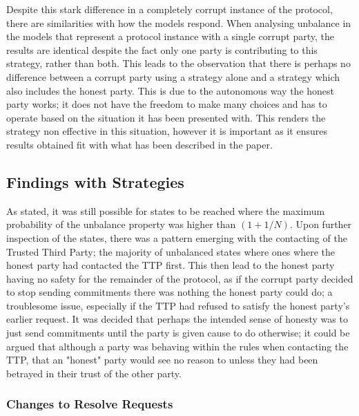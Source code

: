\documentclass{l4proj}
\begin{document}
Despite this stark difference in a completely corrupt instance of the protocol, there are similarities with how the models respond. When analysing unbalance in the models that represent a protocol instance with a single corrupt party, the results are identical despite the fact only one party is contributing to this strategy, rather than both. This leads to the observation that there is perhaps no difference between a corrupt party using a strategy alone and a strategy which also includes the honest party. This is due to the autonomous way the honest party works; it does not have the freedom to make many choices and has to operate based on the situation it has been presented with. This renders the strategy non effective in this situation, however it is important as it ensures results obtained fit with what has been described in the paper.


\subsection{Findings with Strategies}

As stated, it was still possible for states to be reached where the maximum probability of the unbalance property was higher than $(1+1/ N)$. Upon further inspection of the states, there was a pattern emerging with the contacting of the Trusted Third Party; the majority of unbalanced states where ones where the honest party had contacted the TTP first. This then lead to the honest party having no safety for the remainder of the protocol, as if the corrupt party decided to stop sending commitments there was nothing the honest party could do; a troublesome issue, especially if the TTP had refused to satisfy the honest party's earlier request. It was decided that perhaps the intended sense of honesty was to just send commitments until the party is given cause to do otherwise; it could be argued that although a party was behaving within the rules when contacting the TTP, that an "honest" party would see no reason to unless they had been betrayed in their trust of the other party.

\subsubsection{Changes to Resolve Requests}
\end{document}
